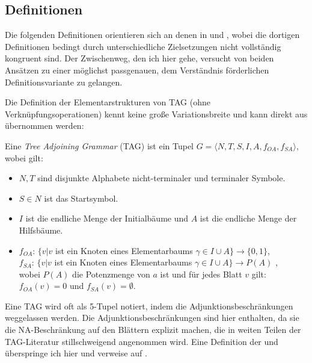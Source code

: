 \subsection{Definitionen}\label{sec-ttmctag-definitionen}

Die folgenden Definitionen orientieren sich an denen in \cite{Kallmeyer:05} und \cite{Kallmeyer:09}, wobei die dortigen Definitionen bedingt durch unterschiedliche Zielsetzungen nicht vollständig kongruent sind. Der Zwischenweg, den ich hier gehe, versucht von beiden Ansätzen zu einer möglichst passgenauen, dem Verständnis förderlichen Definitionsvariante zu gelangen. 

Die Definition der Elementarstrukturen von TAG (ohne Verknüpfungsoperationen) kennt keine gro\ss e Variationsbreite und kann direkt aus \cite{Kallmeyer:09} übernommen werden:   
\begin{definition}
Eine {\it Tree Adjoining Grammar} (TAG) ist ein Tupel $G = \langle N,T,S,I,A,f_{\mathit{OA}},f_{\mathit{SA}} \rangle$, wobei gilt:
\begin{itemize}
  \item $N,T$ sind disjunkte Alphabete nicht-terminaler und terminaler Symbole.
  \item $S \in N$ ist das Startsymbol.
  \item $I$ ist die endliche Menge der Initialbäume und $A$ ist die endliche Menge der Hilfsbäume.
  \item $f_{\mathit{OA}}$: $\{ v | v$ ist ein Knoten eines Elementarbaums $\gamma \in I \cup A \} \to \{0,1\}$, \\
        $f_{\mathit{SA}}$: $\{ v | v$ ist ein Knoten eines Elementarbaums $\gamma \in I \cup A \} \to P(A)$ ,\\
        wobei $P(A)$ die Potenzmenge von $a$ ist und für jedes Blatt $v$ gilt: $f_{\mathit{OA}}(v) = 0$ und $f_{\mathit{SA}}(v) = \emptyset$. 
\end{itemize}
\end{definition}
Eine TAG wird oft als 5-Tupel notiert, indem die Adjunktionsbeschränkungen weggelassen werden. Die Adjunktionsbeschränkungen sind hier enthalten, da sie die NA-Beschränkung auf den Blättern explizit machen, die in weiten Teilen der TAG-Literatur stillschweigend angenommen wird. Eine Definition der  und  überspringe ich hier und verweise auf \citet[59f]{Kallmeyer:09}.

